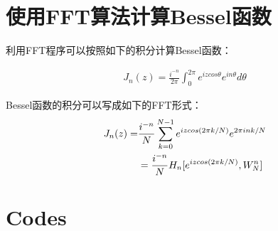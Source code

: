 \section{使用FFT算法计算Bessel函数}
利用FFT程序可以按照如下的积分计算Bessel函数：
\begin{tauenv}[frametitle=Bessel function]
    \begin{align}
        J_n(z)=\frac{i^{-n}}{2\pi}\int^{2\pi}_0 e^{izcos\theta }e^{in\theta }d\theta 
    \end{align}
\end{tauenv}
Bessel函数的积分可以写成如下的FFT形式：
\begin{align}
    J_n(z)=&\frac{i^{-n}}{N}\sum\limits^{N-1}_{k=0} e^{izcos(2\pi k/N) }e^{2\pi ink/N}\notag\\
    &=\frac{i^{-n}}{N}H_n[e^{izcos(2\pi k/N) },W^n_N]
\end{align}
\newpage
\section{Codes}
	\nolinenumbers
	
	\linenumbers



